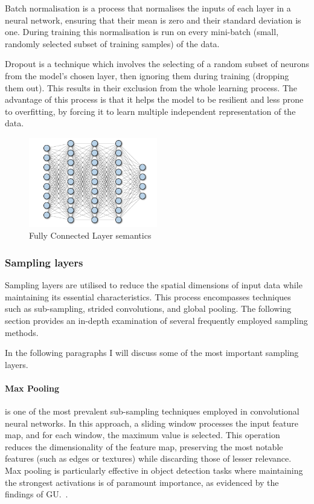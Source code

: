 Batch normalisation is a process that normalises the inputs of each layer in a neural network,
ensuring that their mean is zero and their standard deviation is one.
During training this normalisation is run on every mini-batch (small, randomly selected subset of training samples) of the data.

Dropout is a technique which involves the selecting of a random subset of neurons from the model's chosen layer, then ignoring them during training (dropping them out).
This results in their exclusion from the whole learning process.
The advantage of this process is that it helps the model to be resilient and less prone to overfitting, by forcing it to learn multiple independent representation of the data.

\begin{figure}[ht]
\centering
\includegraphics[width=0.50\textwidth]{figures/fully connected}
\caption{Fully Connected Layer semantics~\cite{article}}
\label{fig:fullconn}
\end{figure}


\subsubsection{Sampling layers}\label{subsub:sampling-layers}
Sampling layers are utilised to reduce the spatial dimensions of input data while maintaining its essential characteristics.
This process encompasses techniques such as sub-sampling,
strided convolutions, and global pooling.
The following section provides an in-depth examination of several frequently employed sampling methods.

In the following paragraphs I will discuss some of the most important sampling layers.

\paragraph{Max Pooling}
is one of the most prevalent sub-sampling techniques employed in convolutional neural networks.
In this approach, a sliding window processes the input feature map, and for each window,
the maximum value is selected. This operation reduces the dimensionality of the feature map,
preserving the most notable features (such as edges or textures) while discarding those of lesser relevance.
Max pooling is particularly effective in object detection tasks where maintaining the strongest activations is of paramount importance, as evidenced by the findings of GU.~\cite{GU2018354}.

